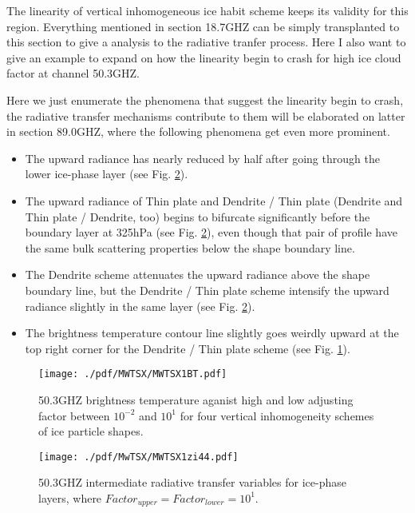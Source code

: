 The linearity of vertical inhomogeneous ice habit scheme keeps its validity for this region. Everything mentioned in section 18.7GHZ can be 
simply transplanted to this section to give a analysis to the radiative tranfer process.
Here I also want to give an example to expand on how the linearity begin to crash for high ice cloud factor at channel 50.3GHZ.

Here we just enumerate the phenomena that suggest the linearity begin to crash, the radiative transfer mechanisms contribute
to them will be elaborated on latter in section 89.0GHZ, where the following phenomena get even more prominent.

\begin{itemize}
    \item The upward radiance has nearly reduced by half after going through the lower ice-phase layer (see Fig. \ref{fig:MWTSX1zi44}).
    \item The upward radiance of Thin plate and Dendrite / Thin plate (Dendrite and Thin plate / Dendrite, too) 
begins to bifurcate significantly before the boundary layer at 325hPa (see Fig. \ref{fig:MWTSX1zi44}),
even though that pair of profile have the same bulk scattering properties below the shape boundary line.
    \item The Dendrite scheme attenuates the upward radiance above the shape boundary line, but the Dendrite / Thin plate
scheme intensify the upward radiance slightly in the same layer (see Fig. \ref{fig:MWTSX1zi44}).
    \item The brightness temperature contour line slightly goes weirdly upward at the top right corner for the Dendrite / Thin plate scheme
    (see Fig. \ref{fig:MWTSX1BT}). 
\end{itemize}

\begin{figure}[hbtp] 
\centering
\texttt{[image: ./pdf/MWTSX/MWTSX1BT.pdf]}
\caption{50.3GHZ brightness temperature aganist high and low adjusting factor between $10^{-2}$ and $10^{1}$ for four vertical 
inhomogeneity schemes of ice particle shapes.}
\label{fig:MWTSX1BT}
\end{figure}

\begin{figure}[hbtp] 
\centering
\texttt{[image: ./pdf/MwTSX/MWTSX1zi44.pdf]}
\caption{50.3GHZ intermediate radiative transfer variables for ice-phase layers, where $Factor_{upper} = Factor_{lower} = 10^{1}$.}
\label{fig:MWTSX1zi44}
\end{figure}

